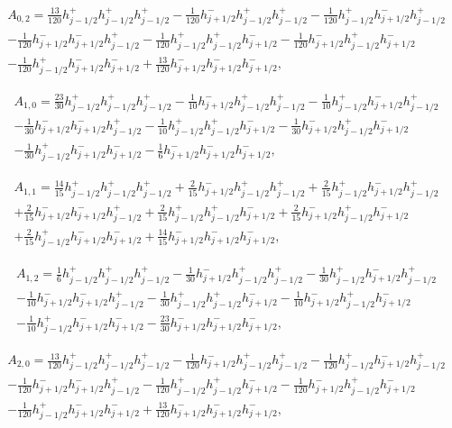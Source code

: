 \documentclass[12pt]{article}
\begin{document}
\begin{multline*} A_{0,2} = \frac{13}{120} h_{j-1/2}^+ h_{j-1/2}^+ h_{j-1/2}^+-\frac{1}{120} h_{j+1/2}^- h_{j-1/2}^+ h_{j-1/2}^+-\frac{1}{120} h_{j-1/2}^+ h_{j+1/2}^- h_{j-1/2}^+\\-\frac{1}{120} h_{j+1/2}^- h_{j+1/2}^- h_{j-1/2}^+-\frac{1}{120} h_{j-1/2}^+ h_{j-1/2}^+ h_{j+1/2}^--\frac{1}{120} h_{j+1/2}^- h_{j-1/2}^+ h_{j+1/2}^-\\-\frac{1}{120} h_{j-1/2}^+ h_{j+1/2}^- h_{j+1/2}^-+\frac{13}{120} h_{j+1/2}^- h_{j+1/2}^- h_{j+1/2}^-, \end{multline*}

\begin{multline*} A_{1,0} = \frac{23}{30} h_{j-1/2}^+ h_{j-1/2}^+ h_{j-1/2}^+-\frac{1}{10} h_{j+1/2}^- h_{j-1/2}^+ h_{j-1/2}^+-\frac{1}{10} h_{j-1/2}^+ h_{j+1/2}^- h_{j-1/2}^+\\-\frac{1}{30} h_{j+1/2}^- h_{j+1/2}^- h_{j-1/2}^+-\frac{1}{10} h_{j-1/2}^+ h_{j-1/2}^+ h_{j+1/2}^--\frac{1}{30} h_{j+1/2}^- h_{j-1/2}^+ h_{j+1/2}^-\\-\frac{1}{30} h_{j-1/2}^+ h_{j+1/2}^- h_{j+1/2}^--\frac{1}{6} h_{j+1/2}^- h_{j+1/2}^- h_{j+1/2}^-, \end{multline*}

\begin{multline*} A_{1,1} = \frac{14}{15} h_{j-1/2}^+ h_{j-1/2}^+ h_{j-1/2}^++\frac{2}{15} h_{j+1/2}^- h_{j-1/2}^+ h_{j-1/2}^++\frac{2}{15} h_{j-1/2}^+ h_{j+1/2}^- h_{j-1/2}^+\\+\frac{2}{15} h_{j+1/2}^- h_{j+1/2}^- h_{j-1/2}^++\frac{2}{15} h_{j-1/2}^+ h_{j-1/2}^+ h_{j+1/2}^-+\frac{2}{15} h_{j+1/2}^- h_{j-1/2}^+ h_{j+1/2}^-\\+\frac{2}{15} h_{j-1/2}^+ h_{j+1/2}^- h_{j+1/2}^-+\frac{14}{15} h_{j+1/2}^- h_{j+1/2}^- h_{j+1/2}^-, \end{multline*}

\begin{multline*} A_{1,2} = \frac{1}{6} h_{j-1/2}^+ h_{j-1/2}^+ h_{j-1/2}^+-\frac{1}{30} h_{j+1/2}^- h_{j-1/2}^+ h_{j-1/2}^+-\frac{1}{30} h_{j-1/2}^+ h_{j+1/2}^- h_{j-1/2}^+\\-\frac{1}{10} h_{j+1/2}^- h_{j+1/2}^- h_{j-1/2}^+-\frac{1}{30} h_{j-1/2}^+ h_{j-1/2}^+ h_{j+1/2}^--\frac{1}{10} h_{j+1/2}^- h_{j-1/2}^+ h_{j+1/2}^-\\-\frac{1}{10} h_{j-1/2}^+ h_{j+1/2}^- h_{j+1/2}^--\frac{23}{30} h_{j+1/2}^- h_{j+1/2}^- h_{j+1/2}^-, \end{multline*}

\begin{multline*} A_{2,0} = \frac{13}{120} h_{j-1/2}^+ h_{j-1/2}^+ h_{j-1/2}^+-\frac{1}{120} h_{j+1/2}^- h_{j-1/2}^+ h_{j-1/2}^+-\frac{1}{120} h_{j-1/2}^+ h_{j+1/2}^- h_{j-1/2}^+\\-\frac{1}{120} h_{j+1/2}^- h_{j+1/2}^- h_{j-1/2}^+-\frac{1}{120} h_{j-1/2}^+ h_{j-1/2}^+ h_{j+1/2}^--\frac{1}{120} h_{j+1/2}^- h_{j-1/2}^+ h_{j+1/2}^-\\-\frac{1}{120} h_{j-1/2}^+ h_{j+1/2}^- h_{j+1/2}^-+\frac{13}{120} h_{j+1/2}^- h_{j+1/2}^- h_{j+1/2}^-, \end{multline*}
\end{document}
